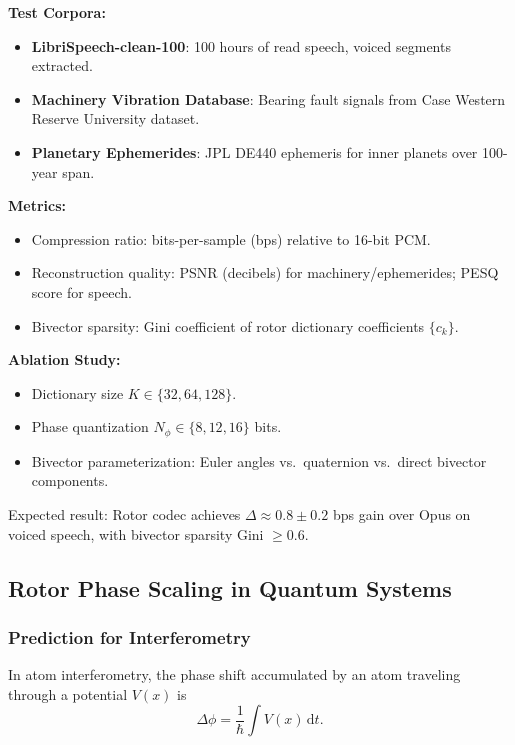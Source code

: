 \documentclass[11pt,a4paper]{article}
\theoremstyle{definition}
\theoremstyle{plain}
\theoremstyle{remark}
\begin{document}
\textbf{Test Corpora:}
\begin{itemize}
  \item \textbf{LibriSpeech-clean-100}: 100 hours of read speech, voiced segments extracted.
  \item \textbf{Machinery Vibration Database}: Bearing fault signals from Case Western Reserve University dataset.
  \item \textbf{Planetary Ephemerides}: JPL DE440 ephemeris for inner planets over 100-year span.
\end{itemize}

\textbf{Metrics:}
\begin{itemize}
  \item Compression ratio: bits-per-sample (bps) relative to 16-bit PCM.
  \item Reconstruction quality: PSNR (decibels) for machinery/ephemerides; PESQ score for speech.
  \item Bivector sparsity: Gini coefficient of rotor dictionary coefficients $\{c_k\}$.
\end{itemize}

\textbf{Ablation Study:}
\begin{itemize}
  \item Dictionary size $K \in \{32, 64, 128\}$.
  \item Phase quantization $N_\phi \in \{8, 12, 16\}$ bits.
  \item Bivector parameterization: Euler angles vs.\ quaternion vs.\ direct bivector components.
\end{itemize}

Expected result: Rotor codec achieves $\Delta \approx 0.8 \pm 0.2$ bps gain over Opus on voiced speech, with bivector sparsity Gini $\geq 0.6$.

\subsection{Rotor Phase Scaling in Quantum Systems}

\subsubsection{Prediction for Interferometry}

In atom interferometry, the phase shift accumulated by an atom traveling through a potential $V(x)$ is
\begin{equation}
\Delta\phi = \frac{1}{\hbar}\int V(x)\, \mathrm{d}t.
\end{equation}
\end{document}
